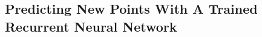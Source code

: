 \documentclass[%
oneside,                 %
final,                   %
10pt]{article}
\begin{document}
\subsection{Predicting New Points With A Trained Recurrent Neural Network}
\end{document}
